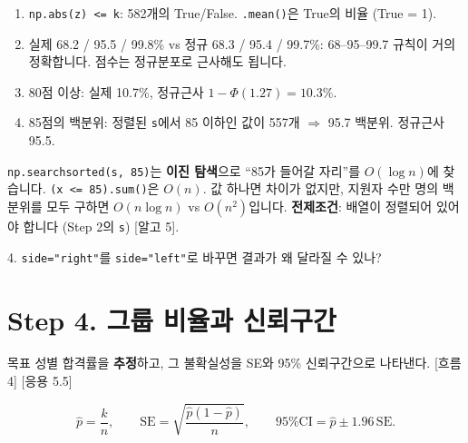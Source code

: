 \documentclass[11pt,a4paper]{article}
\newcommand{\code}[1]{\texttt{#1}}
\newcommand{\Wc}[1]{{\scriptsize\textsf{\color{blue!60!black}[흐름 #1]}}}
\newcommand{\Hc}[1]{{\scriptsize\textsf{\color{orange!70!black}[응용 #1]}}}
\newcommand{\Ac}[1]{{\scriptsize\textsf{\color{green!45!black}[알고 #1]}}}
\begin{document}
\begin{howbox}
\begin{enumerate}
\item \code{np.abs(z) <= k}: 582개의 True/False. \code{.mean()}은 True의 비율 (True = 1).
\item 실제 68.2 / 95.5 / 99.8\% vs 정규 68.3 / 95.4 / 99.7\%: 68–95–99.7 규칙이 거의 정확합니다. 점수는 정규분포로 근사해도 됩니다.
\item 80점 이상: 실제 10.7\%, 정규근사 $1-\Phi(1.27)=10.3\%$.
\item 85점의 백분위: 정렬된 \code{s}에서 85 이하인 값이 557개 $\Rightarrow$ 95.7 백분위. 정규근사 95.5.
\end{enumerate}
\end{howbox}

\begin{algobox}
\code{np.searchsorted(s, 85)}는 \textbf{이진 탐색}으로 ``85가 들어갈 자리''를 $O(\log n)$에 찾습니다. \code{(x <= 85).sum()}은 $O(n)$. 값 하나면 차이가 없지만, 지원자 수만 명의 백분위를 모두 구하면 $O(n\log n)$ vs $O(n^2)$입니다. \textbf{전제조건}: 배열이 정렬되어 있어야 합니다 (Step 2의 \code{s}) \Ac{5}.
\end{algobox}

\begin{qbox}
4. \code{side="right"}를 \code{side="left"}로 바꾸면 결과가 왜 달라질 수 있나?
\end{qbox}

\section{Step 4. 그룹 비율과 신뢰구간}
\begin{goalbox}{목표}
성별 합격률을 \textbf{추정}하고, 그 불확실성을 SE와 95\% 신뢰구간으로 나타낸다. \Wc{4} \Hc{5.5}
\end{goalbox}
\[
\hat p=\frac{k}{n},\qquad \text{SE}=\sqrt{\frac{\hat p(1-\hat p)}n},\qquad \text{95\% CI}=\hat p\pm1.96\,\text{SE}.
\]
\end{document}
